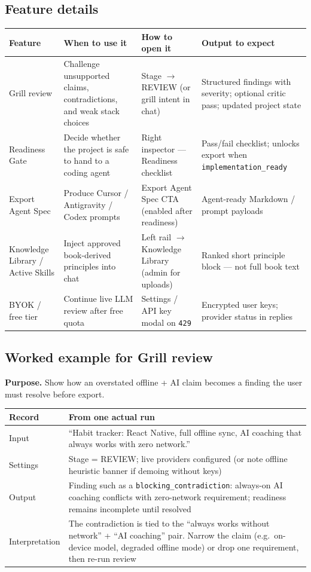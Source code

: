 \documentclass[11pt,a4paper]{article}
\begin{document}
\subsection{Feature details}
{\small
\begin{tabularx}{\textwidth}{@{}L{2.6cm} L{2.8cm} L{3.0cm} Y@{}}
\toprule
\textbf{Feature} & \textbf{When to use it} & \textbf{How to open it} & \textbf{Output to expect} \\
\midrule
Grill review
  & Challenge unsupported claims, contradictions, and weak stack choices
  & Stage \(\rightarrow\) REVIEW (or grill intent in chat)
  & Structured findings with severity; optional critic pass; updated project state \\
\addlinespace
Readiness Gate
  & Decide whether the project is safe to hand to a coding agent
  & Right inspector --- Readiness checklist
  & Pass/fail checklist; unlocks export when \texttt{implementation\_ready} \\
\addlinespace
Export Agent Spec
  & Produce Cursor / Antigravity / Codex prompts
  & Export Agent Spec CTA (enabled after readiness)
  & Agent-ready Markdown / prompt payloads \\
\addlinespace
Knowledge Library / Active Skills
  & Inject approved book-derived principles into chat
  & Left rail \(\rightarrow\) Knowledge Library (admin for uploads)
  & Ranked short principle block --- not full book text \\
\addlinespace
BYOK / free tier
  & Continue live LLM review after free quota
  & Settings / API key modal on \texttt{429}
  & Encrypted user keys; provider status in replies \\
\bottomrule
\end{tabularx}
}

\subsection{Worked example for Grill review}
\textbf{Purpose.} Show how an overstated offline + AI claim becomes a finding
the user must resolve before export.

\begin{tabularx}{\textwidth}{@{}L{3.4cm}Y@{}}
\toprule
\textbf{Record} & \textbf{From one actual run} \\
\midrule
Input
  & ``Habit tracker: React Native, full offline sync, AI coaching that always works with zero network.'' \\
\addlinespace
Settings
  & Stage = REVIEW; live providers configured (or note offline heuristic banner if demoing without keys) \\
\addlinespace
Output
  & Finding such as a \texttt{blocking\_contradiction}: always-on AI coaching conflicts with zero-network requirement; readiness remains incomplete until resolved \\
\addlinespace
Interpretation
  & The contradiction is tied to the ``always works without network'' + ``AI coaching'' pair. Narrow the claim (e.g.\ on-device model, degraded offline mode) or drop one requirement, then re-run review \\
\bottomrule
\end{tabularx}
\end{document}

